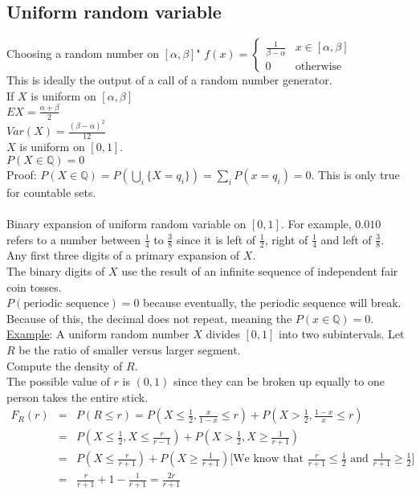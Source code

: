   \subsection*{Uniform random variable}
    Choosing a random number on $[\alpha, \beta]$"
    $f(x) = \begin{cases} \frac{1}{\beta - \alpha} & x \in [\alpha, \beta]\\
    0 & \text{otherwise} \end{cases}$\\
    This is ideally the output of a call of a random number generator.\\
    If $X$ is uniform on $[\alpha, \beta]$\\
    $EX = \frac{\alpha + \beta}{2}$\\
    $Var(X) = \frac{(\beta - \alpha)^2}{12}$\\
    $X$ is uniform on $[0,1]$.\\
    $P(X \in \mathbb{Q}) = 0$\\
    Proof: $P(X \in \mathbb{Q}) = P(\bigcup_i \{X = q_i\}) = \sum_i 
    P(x = q_i) = 0$.
    This is only true for countable sets.\\\\
    Binary expansion of uniform random variable on $[0, 1]$. For example,
    $0.010$ refers to a number between $\frac{1}{4}$ to $\frac{3}{8}$ since
    it is left of $\frac{1}{2}$, right of $\frac{1}{4}$ and left of 
    $\frac{3}{8}$.\\
    Any first three digits of a primary expansion of $X$.\\
    The binary digits of $X$ use the result of an infinite sequence of 
    independent fair coin tosses.\\
    $P(\text{periodic sequence}) = 0$ because eventually, the periodic sequence
    will break.\\
    Because of this, the decimal does not repeat, meaning the $P(x \in 
    \mathbb{Q}) = 0$.\\
    \underline{Example}: A uniform random number $X$ divides $[0,1]$ into two 
    subintervals. Let $R$ be the ratio of smaller versus larger segment.\\
    Compute the density of $R$.\\
    The possible value of $r$ is $(0,1)$ since they can be broken up equally
    to one person takes the entire stick.
    \begin{eqnarray*}
    F_R(r) 
    & = & P(R \le r)= P(X \le \frac{1}{2}, \frac{x}{1 - x} \le r) +
      P(X > \frac{1}{2}, \frac{1 - x}{x} \le r)\\
    & = & P(X \le \frac{1}{2}, X \le \frac{r}{r-1}) + P(X > \frac{1}{2}, X 
      \ge \frac{1}{r+1})\\
    & = & P(X \le \frac{r}{r+1}) + P(X \ge \frac{1}{r+1}) \text{[We know that 
      $\frac{r}{r+1} \le \frac{1}{2}$ and $\frac{1}{r+1} \ge \frac{1}{2}$]}\\
    & = & \frac{r}{r+1} + 1 - \frac{1}{r+1} = \frac{2r}{r+1}
    \end{eqnarray*}

